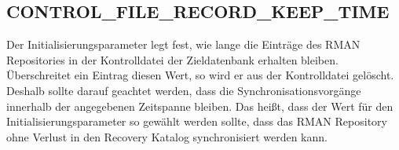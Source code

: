       \subsection{CONTROL\_FILE\_RECORD\_KEEP\_TIME}
        Der Initialisierungsparameter
         legt fest, wie lange die
        Einträge des RMAN Repositories in der Kontrolldatei der Zieldatenbank
        erhalten bleiben. Überschreitet ein Eintrag diesen Wert, so wird er
        aus der Kontrolldatei gelöscht. Deshalb sollte darauf geachtet werden,
        dass die Synchronisationsvorgänge innerhalb der angegebenen Zeitspanne
        bleiben. Das heißt, dass der Wert für den
        Initialisierungsparameter 
        so gewählt werden sollte, dass das RMAN Repository ohne Verlust in den
        Recovery Katalog synchronisiert werden kann.
